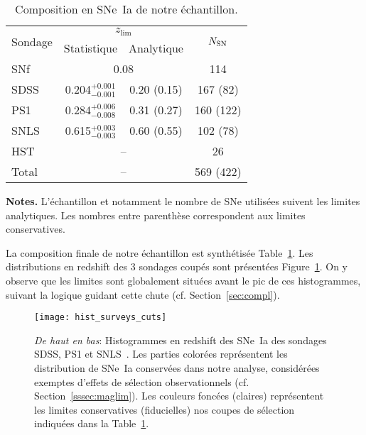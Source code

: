 \documentclass[../main/main.tex]{subfiles}
\begin{document}
\begin{table}[]
    \centering
    \begin{threeparttable}
        \caption{Composition en SNe~Ia de notre échantillon.}
        \label{tab:zlimsample}
        \begin{tabular}{lccc}
            \toprule
            \multirow{2}[2]{*}{Sondage} &
            \multicolumn{2}{c}{$z_{\lim}$} &
            \multirow{2}[2]{*}{$N_{\rm SN}$}\\
            \cmidrule(lr){2-3}
            & Statistique & Analytique & \\
            \midrule
            SNf &
            \multicolumn{2}{c}{0.08} &
            114 \\
            SDSS & 
            0.204$^{+0.001}_{-0.001}$ & 0.20 (0.15) &
            167 (82) \\
            PS1 &
            0.284$^{+0.006}_{-0.008}$ & 0.31 (0.27) &
            160 (122) \\
            SNLS &
            0.615$^{+0.003}_{-0.003}$ & 0.60 (0.55) &
            102 (78) \\
            HST &
            \multicolumn{2}{c}{--} &
            26 \\
            \midrule
            Total & \multicolumn{2}{c}{--} &
            569 (422)\\
            \bottomrule
        \end{tabular}
        \begin{tablenotes}[flushleft]
        \item \textbf{\hspace{-3.2pt}Notes.} L'échantillon et notamment le
            nombre de SNe utilisées suivent les limites analytiques. Les nombres
            entre parenthèse correspondent aux limites conservatives.
        \end{tablenotes}
    \end{threeparttable}
\end{table}

La composition finale de notre échantillon est synthétisée
Table~\ref{tab:zlimsample}. Les distributions en redshift des 3 sondages coupés
sont présentées Figure~\ref{fig:cuts}. On y observe que les limites sont
globalement situées avant le pic de ces histogrammes, suivant la logique guidant
cette chute (cf. Section~\ref{sec:compl}).

\begin{figure}
    \centering
    \texttt{[image: hist\_surveys\_cuts]}
    \caption[Histogrammes des sondages coupés pour notre étude]{\textit{De haut
        en bas}: Histogrammes en redshift des SNe~Ia des sondages SDSS, PS1 et
        SNLS~\citep[données de Pantheon,][]{scolnic2018}. Les parties colorées
        représentent les distribution de SNe~Ia conservées dans notre analyse,
        considérées exemptes d'effets de sélection observationnels (cf.
        Section~\ref{sssec:maglim}). Les couleurs foncées (claires) représentent
        les limites conservatives (fiducielles) nos coupes de sélection
    indiquées dans la Table~\ref{tab:zlimsample}.}
    \label{fig:cuts}
\end{figure}
\end{document}
